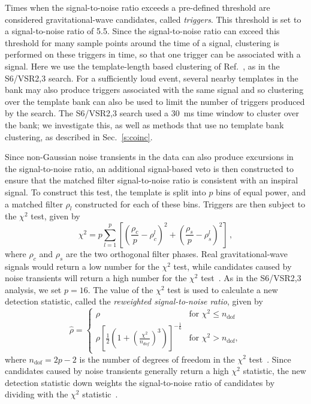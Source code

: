 \documentclass[12pt]{iopart} \usepackage{graphicx,amssymb}
\begin{document}
Times when the signal-to-noise ratio exceeds a pre-defined threshold are
considered gravitational-wave candidates, called
\emph{triggers}\cite{Allen:2005fk}. This threshold is set to a
signal-to-noise ratio of 5.5.  Since the signal-to-noise ratio can exceed
this threshold for many sample points around the time of a signal, clustering
is performed on these triggers in time, so that one trigger can be associated
with a signal. Here we use the template-length based clustering of 
Ref.~\cite{Allen:2005fk}, as in the S6/VSR2,3 search. 
For a sufficiently loud event, several nearby templates in the
bank may also produce triggers associated with the same signal and so
clustering over the template bank can also be used to limit the number of
triggers produced by the search. The S6/VSR2,3 search used a 30~ms time window
to cluster over the bank; we investigate this, as well as methods that use no
template bank clustering, as described in Sec.~\ref{s:coinc}.

Since non-Gaussian noise transients in the data can also produce excursions in
the signal-to-noise ratio, an additional signal-based veto is then constructed
to ensure that the matched filter signal-to-noise ratio is
consistent with an inspiral signal. To construct this test, the
template is split into $p$ bins of equal power, and a matched filter $\rho_l$
constructed for each of these bins. Triggers are then subject to the
$\chi^2$ test, given by
%
\begin{equation}
\chi^2 = p\displaystyle\sum_{l=1}^{p}\left[\left(\frac{\rho_c}{p}-\rho_c^l\right)^2 + \left(\frac{\rho_s}{p}-\rho_s^l\right)^2 \right] \, ,
\label{eq:chisqr}
\end{equation}
%
where $\rho_c$ and $\rho_s$ are the two orthogonal filter phases.
Real gravitational-wave signals would return a low number for the $\chi^2$
test, while candidates caused by noise transients will
return a high number for the $\chi^2$ test~\cite{Allen:2004gu}. As in the 
S6/VSR2,3 analysis, we set $p = 16$. The value of the $\chi^2$ test is used to 
calculate a new detection statistic, called the \emph{reweighted
signal-to-noise ratio}, given by 
%
\begin{equation}
\hat{\rho} =
  \begin{cases}
    \rho &\textrm{for } \chi^2 \leq n_\mathrm{dof}\\
    \rho[\frac{1}{2}(1+(\frac{\chi^2}{n_{dof}})^3)]^{-\frac{1}{6}} &\textrm{for } \chi^2 > n_\mathrm{dof} ,
  \end{cases}
\label{eq:newSNR}
\end{equation}
where $n_\mathrm{dof} = 2p-2$ is the number of degrees of freedom in the
$\chi^2$ test~\cite{Babak:2012zx}.
%
Since candidates caused by noise transients generally return a high $\chi^2$
statistic, the new detection statistic down weights the signal-to-noise ratio
of candidates by dividing with the $\chi^2$ statistic~\cite{Abadie:2011nz}.
\end{document}
